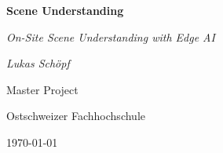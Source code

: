 %
%
%


\begin{titlepage}
    \centering

    {\huge \bfseries \sffamily Scene Understanding \par
     \normalfont\itshape On-Site Scene Understanding with Edge AI \par}
    \vspace{1cm}

    {\large \textsl{Lukas Schöpf}}
    \par
    \vspace{1cm}

    {\textsc Master Project \par}
    {Ostschweizer Fachhochschule \par}
    \today
    \vfill
    

    \vfill

        
    \restoregeometry    
\end{titlepage}

